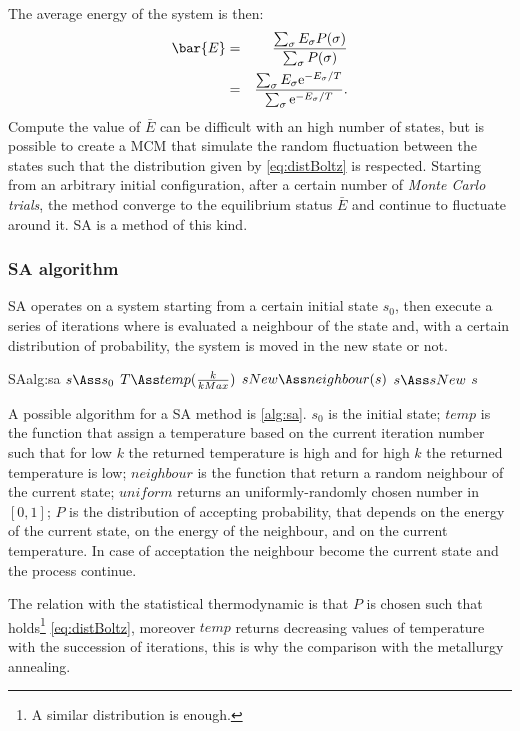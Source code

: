 \documentclass[dissertation.tex]{subfiles}
\begin{document}
The average energy of the system is then:
\begin{eqnarray*}
  \bar{E} &=& \frac{\sum_\sigma E_\sigma P(\sigma)}{\sum_\sigma
    P(\sigma)}\\
  &=& \frac{\sum_\sigma E_\sigma \me^{-E_\sigma/T}}{\sum_\sigma \me^{-E_\sigma/T}}.
\end{eqnarray*}
Compute the value of $\bar{E}$ can be difficult with an high number of
states, but is possible to create a \ac{MCM} that simulate the random
fluctuation between the states such that the distribution given by
\cref{eq:distBoltz} is respected. Starting from an arbitrary initial
configuration, after a certain number of \emph{Monte Carlo trials},
the method converge to the equilibrium status $\bar{E}$ and continue
to fluctuate around it. \ac{SA} is a method of this kind.

\subsubsection{\acf{SA} algorithm}
\ac{SA} operates on a system starting from a certain initial state
$s_0$, then execute a series of iterations where is evaluated a
neighbour of the state and, with a certain distribution of
probability, the system is moved in the new state or not.

\begin{algo}{\acf{SA}}{alg:sa}
  \State $s\Ass s_0$
  \State $T\Ass temp(\frac{k}{kMax})$
  \State $sNew\Ass neighbour(s)$
  \State $s\Ass sNew$
  \EndIf
  \EndFor
  \State\Return $s$
  \EndFunction
\end{algo}
A possible algorithm for a \ac{SA} method is \cref{alg:sa}. $s_0$ is
the initial state; $temp$ is the function that assign a
temperature based on the current iteration number such that for low
$k$ the returned temperature is high and for high $k$ the returned temperature
is low; $neighbour$ is the function that return a random neighbour of
the current state; $uniform$ returns an uniformly-randomly chosen
number in $[0,1]$; $P$ is the distribution of accepting probability,
that depends on the energy of the current state, on the energy of the
neighbour, and on the current temperature. In case of acceptation the
neighbour become the current state and the process continue.

The relation with the statistical thermodynamic is that $P$ is chosen
such that holds\footnote{A similar distribution is enough.}
\cref{eq:distBoltz}, moreover $temp$ returns decreasing values of
temperature with the succession of iterations, this is why the
comparison with the metallurgy annealing.
\end{document}
